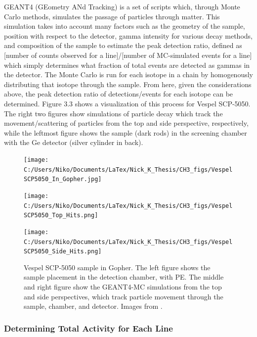 \documentclass{report}
\begin{document}
GEANT4 (GEometry ANd Tracking) is a set of scripts which, through Monte Carlo methods, simulates the passage of particles through matter. This simulation takes into account many factors such as the geometry of the sample, position with respect to the detector, gamma intensity for various decay methods, and composition of the sample to estimate the peak detection ratio, defined as [number of counts observed for a line]/[number of MC-simulated events for a line] which simply determines what fraction of total events are detected as gammas in the detector. The Monte Carlo is run for each isotope in a chain by homogenously distributing that isotope through the sample. From here, given the considerations above, the peak detection ratio of detections/events for each isotope can be determined. Figure 3.3 shows a visualization of this process for Vespel SCP-5050. The right two figures show simulations of particle decay which track the movement/scattering of particles from the top and side perspective, respectively, while the leftmost figure shows the sample (dark rods) in the screening chamber with the Ge detector (silver cylinder in back).

\begin{figure}[h]
\centering
\begin{minipage}{.34\textwidth}
\texttt{[image: C:/Users/Niko/Documents/LaTex/Nick\_K\_Thesis/CH3\_figs/VespelSCP5050\_In\_Gopher.jpg]}
\end{minipage}
\begin{minipage}{.3\textwidth}
\texttt{[image: C:/Users/Niko/Documents/LaTex/Nick\_K\_Thesis/CH3\_figs/VespelSCP5050\_Top\_Hits.png]}
\end{minipage}
\begin{minipage}{.3\textwidth}
\texttt{[image: C:/Users/Niko/Documents/LaTex/Nick\_K\_Thesis/CH3\_figs/VespelSCP5050\_Side\_Hits.png]}
\end{minipage}
\caption{Vespel SCP-5050 sample in Gopher. The left figure shows the sample placement in the detection chamber, with PE. The middle and right figure show the GEANT4-MC simulations from the top and side perspectives, which track particle movement through the sample, chamber, and detector. Images from \cite{GopherSCP5050}.}
\end{figure}

\subsubsection{Determining Total Activity for Each Line}
\end{document}
